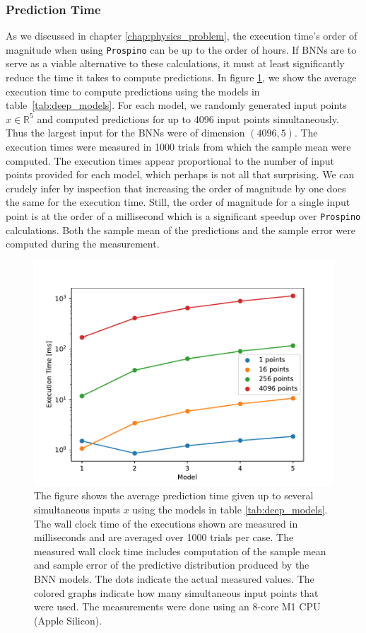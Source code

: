 \subsubsection{Prediction Time}
As we discussed in chapter \ref{chap:physics_problem}, the execution time's order of magnitude when using {\tt Prospino} can be up to the order of hours. 
If BNNs are to serve as a viable alternative to these calculations, it must at least significantly reduce the time it takes to compute predictions. In figure \ref{fig:prediction_time}, we 
show the average execution time to compute predictions using the models in table~\ref{tab:deep_models}.
For each model, we randomly generated input points $x\in \mathbb{R}^5$ and computed predictions for up to 4096 input points simultaneously.
Thus the largest input for the BNNs were of dimension $(4096, 5)$. The execution times were measured in 1000 trials from which the sample mean were computed.
The execution times appear proportional to the number of input points provided for each model, which perhaps is not all that surprising. We can crudely infer by inspection that increasing the order of magnitude by one does the same for the execution time. Still, the order of magnitude for a single input point is at the order of a millisecond which is a significant speedup over {\tt Prospino} calculations. Both the sample mean of the predictions and the sample error were computed during the measurement. 

\begin{figure}[H]
    \centering
    \includegraphics[scale=0.7]{figures/prediction_time/prediction_time.pdf}
    \caption{The figure shows the average prediction time given up to several simultaneous inputs $x$ using the models in table \ref{tab:deep_models}. The wall clock time of the executions shown are measured in milliseconds and are averaged over 1000 trials per case. The measured wall clock time includes computation of the sample mean and sample error of the predictive distribution produced by the BNN models. The dots indicate the actual measured values. The colored graphs indicate how many simultaneous input points that were used. The measurements were done using an 8-core M1 CPU (Apple Silicon).
    }
    \label{fig:prediction_time}
\end{figure}

